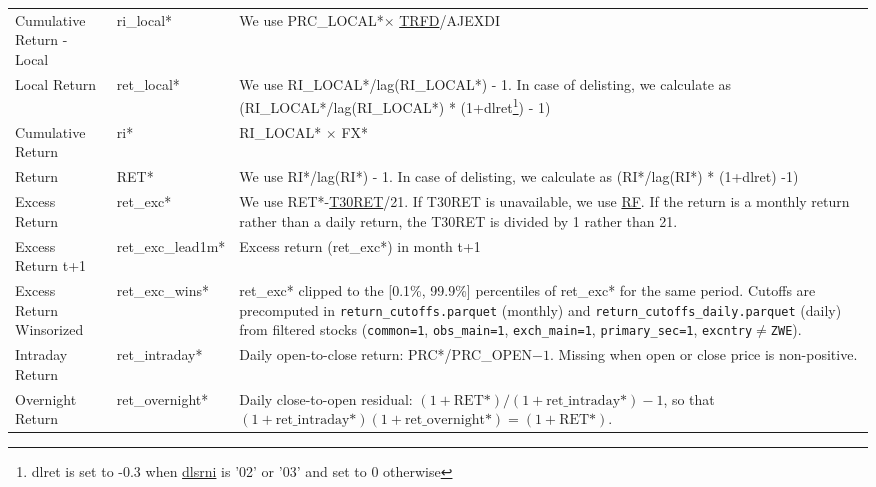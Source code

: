 \documentclass[12pt,title,fleqn]{article}
\begin{document}
{\begin{longtable}{@{\extracolsep{\fill}}|m{5cm}|l|m{8cm}|@{}}
    Cumulative Return - Local & ri\_local\mbox{*} & We use
    PRC\_LOCAL\mbox{*}$\times$ \href{https://wrds-www.wharton.upenn.edu/data-dictionary/form_metadata/comp_na_daily_all_secd_dataitems/TRFD/}{TRFD}/AJEXDI \\
    
    Local Return & ret\_local\mbox{*} & We use RI\_LOCAL\mbox{*}/lag(RI\_LOCAL\mbox{*}) - 1. In case of delisting, we calculate as (RI\_LOCAL\mbox{*}/lag(RI\_LOCAL\mbox{*}) * (1+dlret\footnote{dlret is set to -0.3 when \href{https://wrds-www.wharton.upenn.edu/data-dictionary/comp_na_daily_all/security/dlrsni/}{dlsrni} is '02' or '03' and set to 0 otherwise}) - 1)\\
    
    Cumulative Return & ri\mbox{*} & RI\_LOCAL\mbox{*} $\times$ FX\mbox{*}\\
    
    Return & RET\mbox{*} & We use RI\mbox{*}/lag(RI\mbox{*}) - 1. In case of delisting, we calculate as (RI\mbox{*}/lag(RI\mbox{*}) * (1+dlret) -1)\\
    
    Excess Return & ret\_exc\mbox{*} & We use RET\mbox{*}-\href{https://wrds-www.wharton.upenn.edu/data-dictionary/crsp_a_indexes/indmthseriesdata_ind/#row-mthtotret}{T30RET}/21. If T30RET is unavailable, we use 
    \href{https://wrds-www.wharton.upenn.edu/data-dictionary/ff_all/factors_monthly/#row-rf}{RF}. If the return is a monthly return rather than a daily return, the T30RET is divided by 1 rather than 21. \\
    
    Excess Return t+1 & ret\_exc\_lead1m\mbox{*} &  Excess return (ret\_exc\mbox{*}) in month t+1 \\

    Excess Return Winsorized & ret\_exc\_wins\mbox{*} & ret\_exc\mbox{*} clipped to the [0.1\%, 99.9\%] percentiles of ret\_exc\mbox{*} for the same period. Cutoffs are precomputed in \texttt{return\_cutoffs.parquet} (monthly) and \texttt{return\_cutoffs\_daily.parquet} (daily) from filtered stocks (\texttt{common=1}, \texttt{obs\_main=1}, \texttt{exch\_main=1}, \texttt{primary\_sec=1}, \texttt{excntry$\neq$ZWE}). \\

    Intraday Return & ret\_intraday\mbox{*} & Daily open-to-close return: PRC\mbox{*}/PRC\_OPEN$-1$. Missing when open or close price is non-positive. \\

    Overnight Return & ret\_overnight\mbox{*} & Daily close-to-open residual: $(1+\mathrm{RET}\mbox{*})/(1+\mathrm{ret\_intraday}\mbox{*})-1$, so that $(1+\mathrm{ret\_intraday}\mbox{*})(1+\mathrm{ret\_overnight}\mbox{*})=(1+\mathrm{RET}\mbox{*})$. \\


\end{longtable}}
\end{document}
